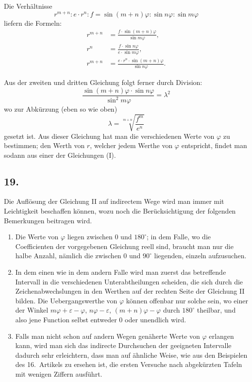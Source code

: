 \documentclass[12pt,a4paper]{article}
\newcommand{\1}{\ensuremath{\mathrlap{\,|\,}}} %
\begin{document}
Die Verhältnisse
\[r^{m+n} : e \cdot r^n : f = \sin(m+n)\varphi : \sin n\varphi : \sin m\varphi\]
liefern die Formeln:
\begin{align*}
r^{m+n} &= \frac{f \cdot \sin(m+n)\varphi}{\sin m\varphi},\\
r^n &= \frac{f \cdot \sin n\varphi}{e \cdot \sin m\varphi},\\
r^{m+n} &= \frac{e \cdot r^n \cdot \sin(m+n)\varphi}{\sin n\varphi}.\tag{I}
\end{align*}

Aus der zweiten und dritten Gleichung folgt ferner durch Division:
\[\frac{\sin(m+n)\varphi \cdot \sin n\varphi}{\sin^2 m\varphi} = \lambda^2\tag{II}\]
wo zur Abkürzung (eben so wie oben)
\[\lambda = \sqrt[m+n]{\frac{f^m}{e^n}}\]
gesetzt ist. Aus dieser Gleichung hat man die verschiedenen Werte von $\varphi$ zu bestimmen; den Werth von $r$, welcher jedem Werthe von $\varphi$ entspricht, findet man sodann aus einer der Gleichungen (I).

\subsection*{19.}

Die Auflösung der Gleichung II auf indirectem Wege wird man immer mit Leichtigkeit beschaffen können, wozu noch die Berücksichtigung der folgenden Bemerkungen beitragen wird.

\begin{enumerate}[label=\arabic*)]
\item Die Werte von $\varphi$ liegen zwischen $0$ und $180^{\circ}$; in dem Falle, wo die Coefficienten der vorgegebenen Gleichung reell sind, braucht man nur die halbe Anzahl, nämlich die zwischen $0$ und $90^{\circ}$ liegenden, einzeln aufzusuchen.

\item In dem einen wie in dem andern Falle wird man zuerst das betreffende Intervall in die verschiedenen Unterabtheilungen scheiden, die sich durch die Zeichenabwechslungen in den Werthen auf der rechten Seite der Gleichung II bilden. Die Uebergangswerthe von $\varphi$ können offenbar nur solche sein, wo einer der Winkel $m\varphi + \varepsilon - \varphi$, $n\varphi - \varepsilon$, $(m+n)\varphi - \varphi$ durch $180^{\circ}$ theilbar, und also jene Function selbst entweder $0$ oder unendlich wird.

\item Falls man nicht schon auf andern Wegen genäherte Werte von $\varphi$ erlangen kann, wird man sich das indirecte Durchsuchen der geeigneten Intervalle dadurch sehr erleichtern, dass man auf ähnliche Weise, wie aus den Beispielen des 16.~Artikels zu ersehen ist, die ersten Versuche nach abgekürzten Tafeln mit wenigen Ziffern ausführt.
\end{enumerate}
\end{document}
